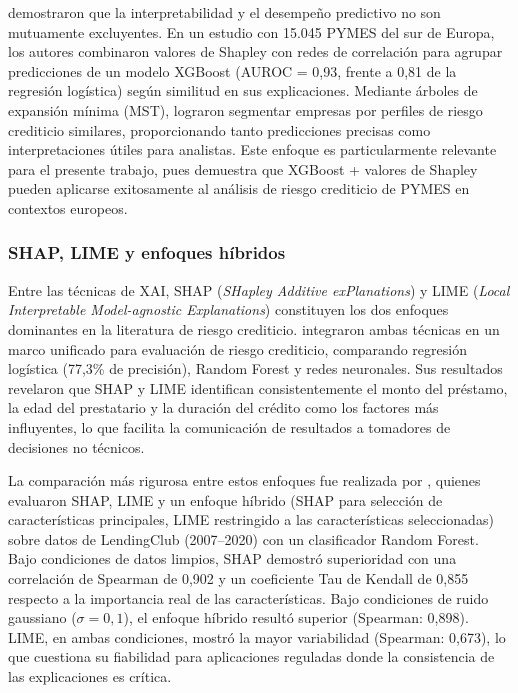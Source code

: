 \documentclass[12pt, letterpaper]{article}
\begin{document}
\citet{Bussmann2020} demostraron que la interpretabilidad y el desempe\~no predictivo no son mutuamente excluyentes. En un estudio con 15.045 PYMES del sur de Europa, los autores combinaron valores de Shapley con redes de correlaci\'on para agrupar predicciones de un modelo XGBoost (AUROC = 0,93, frente a 0,81 de la regresi\'on log\'istica) seg\'un similitud en sus explicaciones. Mediante \'arboles de expansi\'on m\'inima (MST), lograron segmentar empresas por perfiles de riesgo crediticio similares, proporcionando tanto predicciones precisas como interpretaciones \'utiles para analistas. Este enfoque es particularmente relevante para el presente trabajo, pues demuestra que XGBoost + valores de Shapley pueden aplicarse exitosamente al an\'alisis de riesgo crediticio de PYMES en contextos europeos.

\subsubsection{SHAP, LIME y enfoques h\'ibridos}

Entre las t\'ecnicas de XAI, SHAP (\textit{SHapley Additive exPlanations}) y LIME (\textit{Local Interpretable Model-agnostic Explanations}) constituyen los dos enfoques dominantes en la literatura de riesgo crediticio. \citet{Oyeyemi2025} integraron ambas t\'ecnicas en un marco unificado para evaluaci\'on de riesgo crediticio, comparando regresi\'on log\'istica (77,3\% de precisi\'on), Random Forest y redes neuronales. Sus resultados revelaron que SHAP y LIME identifican consistentemente el monto del pr\'estamo, la edad del prestatario y la duraci\'on del cr\'edito como los factores m\'as influyentes, lo que facilita la comunicaci\'on de resultados a tomadores de decisiones no t\'ecnicos.

La comparaci\'on m\'as rigurosa entre estos enfoques fue realizada por \citet{Pathi2025}, quienes evaluaron SHAP, LIME y un enfoque h\'ibrido (SHAP para selecci\'on de caracter\'isticas principales, LIME restringido a las caracter\'isticas seleccionadas) sobre datos de LendingClub (2007--2020) con un clasificador Random Forest. Bajo condiciones de datos limpios, SHAP demostr\'o superioridad con una correlaci\'on de Spearman de 0,902 y un coeficiente Tau de Kendall de 0,855 respecto a la importancia real de las caracter\'isticas. Bajo condiciones de ruido gaussiano ($\sigma = 0,1$), el enfoque h\'ibrido result\'o superior (Spearman: 0,898). LIME, en ambas condiciones, mostr\'o la mayor variabilidad (Spearman: 0,673), lo que cuestiona su fiabilidad para aplicaciones reguladas donde la consistencia de las explicaciones es cr\'itica.
\end{document}
